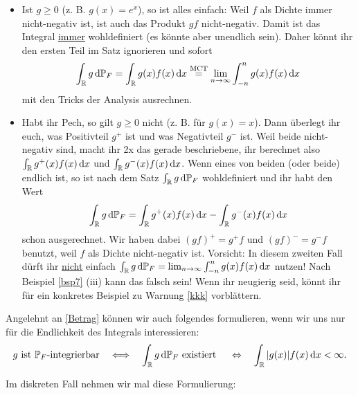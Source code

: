 \begin{itemize}
 	\item Ist $g\geq 0$ (z. B. $g(x)=e^{x}$), so ist alles einfach: Weil $f$ als Dichte immer nicht-negativ ist, ist auch das Produkt $gf$ nicht-negativ. Damit ist das Integral \underline{immer} wohldefiniert (es k\"onnte aber unendlich sein). Daher k\"onnt ihr den ersten Teil im Satz ignorieren und sofort
	\begin{align*}
		\int_{\mathbb{R}} g \, \mathrm{d} \mathbb{P}_F=\int_{\mathbb{R}} g(x) f(x) \, \mathrm{d} x\overset{\text{MCT}}{=}\lim_{n\to\infty}\int_{-n}^n g(x) f(x) \, \mathrm{d} x
	\end{align*}	
	mit den Tricks der Analysis ausrechnen.
	\item Habt ihr Pech, so gilt $g\geq 0$ nicht (z. B. f\"ur $g(x)=x$). Dann \"uberlegt ihr euch, was Positivteil $g^+$ ist und was Negativteil $g^-$ ist. Weil beide nicht-negativ sind, macht ihr 2x das gerade beschriebene, ihr berechnet also $\int_{\mathbb{R}} g^+(x) f(x) \, \mathrm{d} x$ und $\int_{\mathbb{R}} g^-(x) f(x) \, \mathrm{d} x$. Wenn eines von beiden (oder beide) endlich ist, so ist nach dem Satz $\int_{\mathbb{R}} g \, \mathrm{d} \mathbb{P}_F$ wohldefiniert und ihr habt den Wert $$\int_{\mathbb{R}} g \, \mathrm{d} \mathbb{P}_F=\int_{\mathbb{R}} g^+(x) f(x) \, \mathrm{d} x-\int_{\mathbb{R}} g^-(x) f(x) \, \mathrm{d} x$$ schon ausgerechnet. Wir haben dabei $(gf)^+=g^+f$ und $(gf)^-=g^-f$ benutzt, weil $f$ als Dichte nicht-negativ ist. Vorsicht: In diesem zweiten Fall d\"urft ihr \underline{nicht} einfach $\int_{\mathbb{R}} g \, \mathrm{d} \mathbb{P}_F=\lim_{n\to\infty} \int_{-n}^n g(x)f(x)\, \mathrm{d} x$ nutzen! Nach Beispiel \ref{bsp7} (iii) kann das falsch sein! Wenn ihr neugierig seid, k\"onnt ihr f\"ur ein konkretes Beispiel zu Warnung \ref{kkk} vorbl\"attern.
 \end{itemize}
 
Angelehnt an \eqref{Betrag} k\"onnen wir auch folgendes formulieren, wenn wir uns nur f\"ur die Endlichkeit des Integrals interessieren:
	\begin{align}\label{Gleich}
		g\text{ ist }\mathbb{P}_F\text{-integrierbar}\quad\Longleftrightarrow\quad	\int_{\mathbb{R}} g \, \mathrm{d} \mathbb{P}_F \text{ existiert }\quad \Leftrightarrow\quad \int_{\mathbb{R}} |g(x)|f(x) \, \mathrm{d} x<\infty.
	\end{align}
	\marginpar{\textcolor{red}{Vorlesung 13}}
	
	

Im diskreten Fall nehmen wir mal diese Formulierung:

